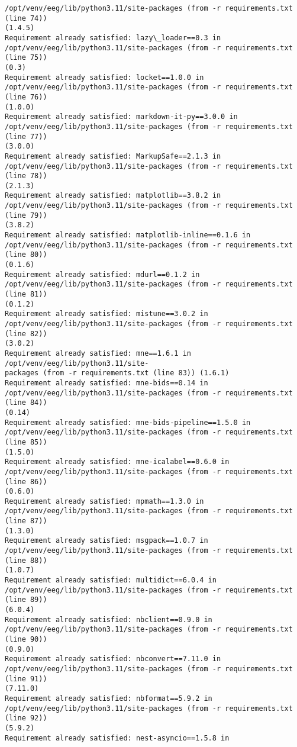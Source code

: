 \documentclass[11pt]{article}
\begin{document}
\begin{Verbatim}[commandchars=\\\{\}]
/opt/venv/eeg/lib/python3.11/site-packages (from -r requirements.txt (line 74))
(1.4.5)
Requirement already satisfied: lazy\_loader==0.3 in
/opt/venv/eeg/lib/python3.11/site-packages (from -r requirements.txt (line 75))
(0.3)
Requirement already satisfied: locket==1.0.0 in
/opt/venv/eeg/lib/python3.11/site-packages (from -r requirements.txt (line 76))
(1.0.0)
Requirement already satisfied: markdown-it-py==3.0.0 in
/opt/venv/eeg/lib/python3.11/site-packages (from -r requirements.txt (line 77))
(3.0.0)
Requirement already satisfied: MarkupSafe==2.1.3 in
/opt/venv/eeg/lib/python3.11/site-packages (from -r requirements.txt (line 78))
(2.1.3)
Requirement already satisfied: matplotlib==3.8.2 in
/opt/venv/eeg/lib/python3.11/site-packages (from -r requirements.txt (line 79))
(3.8.2)
Requirement already satisfied: matplotlib-inline==0.1.6 in
/opt/venv/eeg/lib/python3.11/site-packages (from -r requirements.txt (line 80))
(0.1.6)
Requirement already satisfied: mdurl==0.1.2 in
/opt/venv/eeg/lib/python3.11/site-packages (from -r requirements.txt (line 81))
(0.1.2)
Requirement already satisfied: mistune==3.0.2 in
/opt/venv/eeg/lib/python3.11/site-packages (from -r requirements.txt (line 82))
(3.0.2)
Requirement already satisfied: mne==1.6.1 in /opt/venv/eeg/lib/python3.11/site-
packages (from -r requirements.txt (line 83)) (1.6.1)
Requirement already satisfied: mne-bids==0.14 in
/opt/venv/eeg/lib/python3.11/site-packages (from -r requirements.txt (line 84))
(0.14)
Requirement already satisfied: mne-bids-pipeline==1.5.0 in
/opt/venv/eeg/lib/python3.11/site-packages (from -r requirements.txt (line 85))
(1.5.0)
Requirement already satisfied: mne-icalabel==0.6.0 in
/opt/venv/eeg/lib/python3.11/site-packages (from -r requirements.txt (line 86))
(0.6.0)
Requirement already satisfied: mpmath==1.3.0 in
/opt/venv/eeg/lib/python3.11/site-packages (from -r requirements.txt (line 87))
(1.3.0)
Requirement already satisfied: msgpack==1.0.7 in
/opt/venv/eeg/lib/python3.11/site-packages (from -r requirements.txt (line 88))
(1.0.7)
Requirement already satisfied: multidict==6.0.4 in
/opt/venv/eeg/lib/python3.11/site-packages (from -r requirements.txt (line 89))
(6.0.4)
Requirement already satisfied: nbclient==0.9.0 in
/opt/venv/eeg/lib/python3.11/site-packages (from -r requirements.txt (line 90))
(0.9.0)
Requirement already satisfied: nbconvert==7.11.0 in
/opt/venv/eeg/lib/python3.11/site-packages (from -r requirements.txt (line 91))
(7.11.0)
Requirement already satisfied: nbformat==5.9.2 in
/opt/venv/eeg/lib/python3.11/site-packages (from -r requirements.txt (line 92))
(5.9.2)
Requirement already satisfied: nest-asyncio==1.5.8 in

\end{Verbatim}
\end{document}
